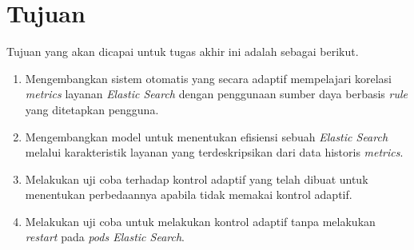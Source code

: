 \section{Tujuan}

Tujuan yang akan dicapai untuk tugas akhir ini adalah sebagai berikut.

\begin{enumerate}
    \item Mengembangkan sistem otomatis yang secara adaptif mempelajari korelasi \textit{metrics} layanan \textit{Elastic Search} dengan penggunaan sumber daya berbasis \textit{rule} yang ditetapkan pengguna.
    \item Mengembangkan model untuk menentukan efisiensi sebuah \textit{Elastic Search} melalui karakteristik layanan yang terdeskripsikan dari data historis \textit{metrics}.
    \item Melakukan uji coba terhadap kontrol adaptif yang telah dibuat untuk menentukan perbedaannya apabila tidak memakai kontrol adaptif.
    \item Melakukan uji coba untuk melakukan kontrol adaptif tanpa melakukan \textit{restart} pada \textit{pods Elastic Search}.
\end{enumerate}